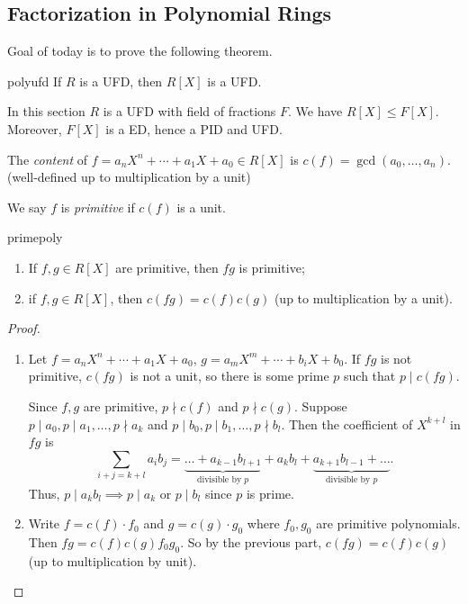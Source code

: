 \subsection{Factorization in Polynomial Rings}
Goal of today is to prove the following theorem.
\begin{theorem}{}{polyufd}
    If \(R\) is a UFD, then \(R[X]\) is a UFD.
\end{theorem}
In this section \(R\) is a UFD with field of fractions \(F\). We have \(R[X] \leq F[X]\). Moreover, \(F[X]\) is a ED, hence a PID and UFD.
\begin{definition}{}{}
    The \textit{content} of \(f=a_n X^n + \cdots + a_1 X + a_0 \in R[X]\) is \(c(f) = \gcd(a_0, \ldots, a_n)\). (well-defined up to multiplication by a unit)

    We say \(f\) is \textit{primitive} if \(c(f)\) is a unit.
\end{definition}
\begin{lemma}{}{primepoly}
    \leavevmode
    \begin{enumerate}
        \item If \(f,g \in R[X]\) are primitive, then \(fg\) is primitive;
        \item if \(f,g\in R[X]\), then \(c(fg) = c(f)c(g)\) (up to multiplication by a unit).
    \end{enumerate}
\end{lemma}
\begin{proof}
    \leavevmode
    \begin{enumerate}
        \item Let \(f = a_n X^n + \cdots + a_1 X + a_0\), \(g = a_m X^m + \cdots + b_i X + b_0\). If \(fg\) is not primitive, \(c(fg)\) is not a unit, so there is some prime \(p\) such that \(p \mid c(fg)\).
    
        Since \(f, g\) are primitive, \(p \nmid c(f)\) and \(p \nmid c(g)\). Suppose \(p \mid a_0, p \mid a_1, \ldots, p \nmid a_k\) and \(p \mid b_0, p \mid b_1, \ldots,p \nmid b_l\). Then the coefficient of \(X^{k + l}\) in \(fg\) is
        \[
            \sum_{i + j = k + l}a_{i}b_j = \underbrace{\ldots + a_{k-1}b_{l+1}}_{\text{divisible by }p} + a_{k}b_l + \underbrace{a_{k+1}b_{l-1} + \ldots}_{\text{divisible by }p}.
        \]
        Thus, \(p \mid a_k b_l \implies p \mid a_k\) or \(p \mid b_l\) since \(p\) is prime.
        \item Write \(f = c(f)\cdot f_0\) and \(g = c(g)\cdot g_0\) where \(f_0, g_0\) are primitive polynomials. Then \(fg = c(f)c(g)f_{0}g_0\). So by the previous part, \(c(fg)= c(f)c(g)\) (up to multiplication by unit).
    \end{enumerate}
\end{proof}
